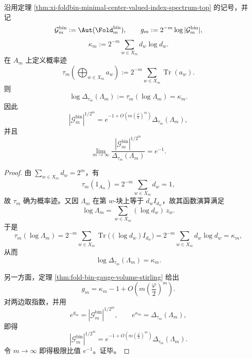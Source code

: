 \begin{theorem}\label{thm:xi-foldbin-fkdet-logvolume-kappa}
沿用定理 \ref{thm:xi-foldbin-minimal-center-valued-index-spectrum-top} 的记号，并记
\[
\mathcal G_m^{\mathrm{bin}}:=\Aut(\Fold_m^{\mathrm{bin}}),
\qquad
g_m:=2^{-m}\log|\mathcal G_m^{\mathrm{bin}}|,
\]
\[
\kappa_m:=2^{-m}\sum_{w\in X_m}d_w\log d_w.
\]
在 \(A_m\) 上定义概率迹
\[
\tau_m\!\left(\bigoplus_{w\in X_m}a_w\right)
:=
2^{-m}\sum_{w\in X_m}\operatorname{Tr}(a_w).
\]
则
\[
\log\Delta_{\tau_m}(\Lambda_m):=\tau_m(\log\Lambda_m)=\kappa_m.
\]
因此
\[
|\mathcal G_m^{\mathrm{bin}}|^{1/2^m}
=
e^{-1+O\!\left(m\left(\frac{\varphi}{2}\right)^m\right)}
\Delta_{\tau_m}(\Lambda_m),
\]
并且
\[
\lim_{m\to\infty}
\frac{|\mathcal G_m^{\mathrm{bin}}|^{1/2^m}}{\Delta_{\tau_m}(\Lambda_m)}
=
e^{-1}.
\]
\end{theorem}
\begin{proof}
由 \(\sum_{w\in X_m}d_w=2^m\)，有
\[
\tau_m(1_{A_m})=2^{-m}\sum_{w\in X_m}d_w=1,
\]
故 \(\tau_m\) 确为概率迹。又因 \(\Lambda_m\) 在第 \(w\)-块上等于 \(d_w I_{d_w}\)，故其函数演算满足
\[
\log\Lambda_m=\sum_{w\in X_m}(\log d_w)\,z_w.
\]
于是
\[
\tau_m(\log\Lambda_m)
=
2^{-m}\sum_{w\in X_m}\operatorname{Tr}\!\bigl((\log d_w)I_{d_w}\bigr)
=
2^{-m}\sum_{w\in X_m}d_w\log d_w
=
\kappa_m,
\]
从而
\[
\log\Delta_{\tau_m}(\Lambda_m)=\kappa_m.
\]

另一方面，定理 \ref{thm:fold-bin-gauge-volume-stirling} 给出
\[
g_m=\kappa_m-1+O\!\left(m\left(\frac{\varphi}{2}\right)^m\right).
\]
对两边取指数，并用
\[
e^{g_m}=|\mathcal G_m^{\mathrm{bin}}|^{1/2^m},
\qquad
e^{\kappa_m}=\Delta_{\tau_m}(\Lambda_m),
\]
即得
\[
|\mathcal G_m^{\mathrm{bin}}|^{1/2^m}
=
e^{-1+O\!\left(m\left(\frac{\varphi}{2}\right)^m\right)}
\Delta_{\tau_m}(\Lambda_m).
\]
令 \(m\to\infty\) 即得极限比值 \(e^{-1}\)。证毕。
\end{proof}

